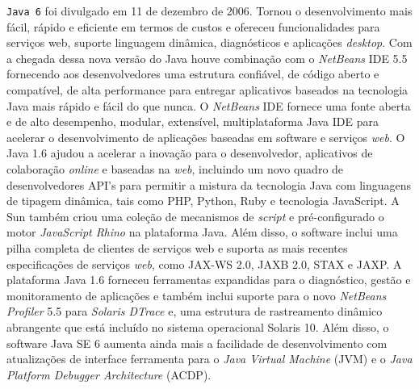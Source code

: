 \texttt{Java 6} foi divulgado em 11 de dezembro de 2006. Tornou o desenvolvimento mais f\'{a}cil, r\'{a}pido e eficiente em termos de custos e ofereceu funcionalidades para serviços web, suporte linguagem din\^{a}mica, diagn\'{o}sticos e aplicaç\~{o}es {\it desktop}. Com a chegada dessa nova vers\~{a}o do Java houve combinaç\~{a}o com o {\it NetBeans} IDE 5.5 fornecendo aos desenvolvedores uma estrutura confi\'{a}vel, de c\'{o}digo aberto e compat\'{i}vel, de alta performance para entregar aplicativos baseados na tecnologia Java mais r\'{a}pido e f\'{a}cil do que nunca. O {\it NetBeans} IDE fornece uma fonte aberta e de alto desempenho, modular, extens\'{i}vel, multiplataforma Java IDE para acelerar o desenvolvimento de aplicaç\~{o}es baseadas em software e serviços {\it web}. O Java 1.6 ajudou a acelerar a inovaç\~{a}o para o desenvolvedor, aplicativos de colaboraç\~{a}o {\it online} e baseadas na {\it web}, incluindo um novo quadro de desenvolvedores \acs{API}'s para permitir a mistura da tecnologia Java com linguagens de tipagem din\^{a}mica, tais como PHP, Python, Ruby e tecnologia JavaScript. A Sun tamb\'{e}m criou uma coleç\~{a}o de mecanismos de {\it script} e pr\'{e}-configurado o motor {\it JavaScript Rhino} na plataforma Java. Al\'{e}m disso, o software inclui uma pilha completa de clientes de serviços web e suporta as mais recentes especificaç\~{o}es de serviços {\it web}, como \acs{JAX-WS} 2.0, \acs{JAXB} 2.0, \acs{STAX} e \acs{JAXP}. A plataforma Java 1.6 forneceu ferramentas expandidas para o diagn\'{o}stico, gest\~{a}o e monitoramento de aplicaç\~{o}es e tamb\'{e}m inclui suporte para o novo {\it NetBeans Profiler} 5.5 para {\it Solaris DTrace } e, uma estrutura de rastreamento din\^{a}mico abrangente que est\'{a} inclu\'{i}do no sistema operacional Solaris 10. Al\'{e}m disso, o software Java SE 6 aumenta ainda mais a facilidade de desenvolvimento com atualizaç\~{o}es de interface ferramenta para o {\it Java Virtual Machine} (\acs{JVM}) e o {\it Java Platform Debugger Architecture} (\acs{ACDP}).


